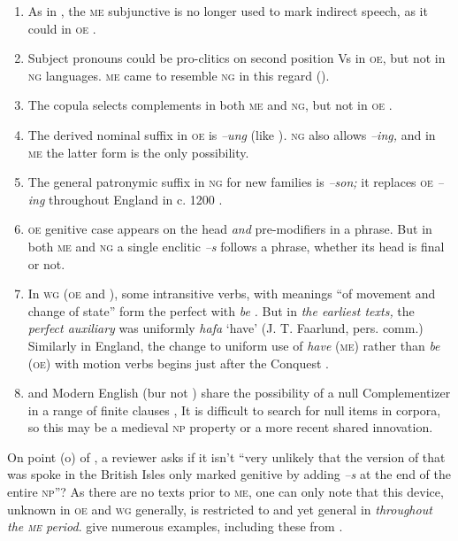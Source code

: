 \documentclass[output=paper]{LSP/langsci}
\begin{document}
\begin{enumerate}[label={(\alph*)}]
\item As in , the \textsc{me} subjunctive is no longer used to mark indirect speech, as it could in \textsc{oe} \citep[314]{Fischer1992}. 
\item Subject pronouns could be pro-clitics on second position Vs in \textsc{oe}, but not in \textsc{ng} languages. \textsc{me} came to resemble \textsc{ng} in this regard (\citealt{KrochEtAl2000}).
\item The copula selects  complements in both \textsc{me} and \textsc{ng}, but not in \textsc{oe} \citep[336--337]{Fischer1992}. 
\item The derived nominal suffix in \textsc{oe} is \textit{–ung} (like )\textit{.} \textsc{ng} also allows \textit{–ing,} and in \textsc{me} the latter form is the only possibility.
\item The general patronymic suffix in \textsc{ng} for new families is \textit{–son;} it replaces \textsc{oe}\textit{ –ing} throughout England in c. 1200 \citep{Strang1970}.
\item \textsc{oe} genitive case appears on the head \textit{and} pre-modifiers in a  phrase. But in both \textsc{me} and \textsc{ng} a single enclitic \textit{–s} follows a  phrase, whether its head is final or not.
\item In \textsc{wg} (\textsc{oe} and ), some intransitive verbs, with meanings “of movement and change of state” form the perfect with \textit{be} \citep{Denison1993}\textit{.} But in \textit{the earliest  texts,} the \textit{perfect auxiliary} was uniformly \textit{hafa} ‘have’ (J. T. Faarlund, pers. comm.) Similarly in England, the change to uniform use of \textit{have} (\textsc{me}) rather than \textit{be} (\textsc{oe}) with motion verbs begins just after the Conquest \citep[350--355]{Denison1993}. 
\item {} and Modern English (bur not ) share the possibility of a null Complementizer in a range of finite clauses \citep{Holmberg2016norse}, It is difficult to search for null items in corpora, so this may be a medieval \textsc{np} property or a more recent shared innovation.
\end{enumerate}

  On point (o) of , a reviewer asks if it isn’t ``very unlikely that the version of  that was spoke in the British Isles only marked genitive by adding \textit{–s} at the end of the entire \textsc{np}''? As there are no texts prior to \textsc{me}, one can only note that this device, unknown in \textsc{oe} and \textsc{wg} generally, is restricted to and yet general in  \textit{throughout the \textsc{me} period}.  \citet{ChalupováInPreparation} give numerous examples, including these from \citet{Kroch2000}.
\end{document}
